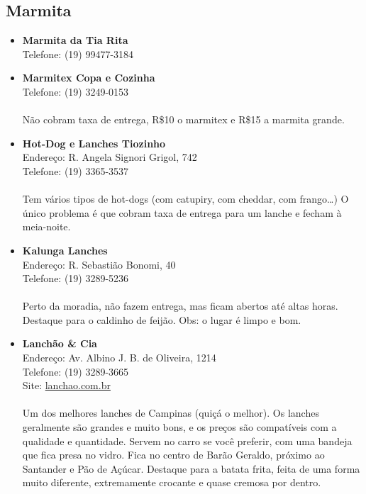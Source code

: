 \subsection{Marmita}

\begin{itemize}
\item \textbf{Marmita da Tia Rita}
  \\Telefone: (19) 99477-3184

\item \textbf{Marmitex Copa e Cozinha}
  \\Telefone: (19) 3249-0153
  \\
  \\Não cobram taxa de entrega, R\$10 o marmitex e R\$15 a marmita grande.

\item \textbf{Hot-Dog e Lanches Tiozinho}
  \\Endereço: R. Angela Signori Grigol, 742
  \\Telefone: (19) 3365-3537
  \\
  \\Tem vários tipos de hot-dogs (com catupiry, com cheddar, com frango{\dots})
  O único problema é que cobram taxa de entrega para um lanche e fecham à
  meia-noite.

\item \textbf{Kalunga Lanches}
  \\Endereço: R. Sebastião Bonomi, 40
  \\Telefone: (19) 3289-5236
  \\
  \\Perto da moradia, não fazem entrega, mas ficam abertos até altas horas.
  Destaque para o caldinho de feijão. Obs: o lugar é limpo e bom.

\item \textbf{Lanchão \& Cia}
  \\Endereço: Av. Albino J. B. de Oliveira, 1214
  \\Telefone: (19) 3289-3665
  \\Site: \url{lanchao.com.br}
  \\
  \\Um dos melhores lanches de Campinas (quiçá o melhor). Os lanches geralmente
  são grandes e muito bons, e os preços são compatíveis com a qualidade e
  quantidade. Servem no carro se você preferir, com uma bandeja que fica presa
  no vidro. Fica no centro de Barão Geraldo, próximo ao Santander e Pão de
  Açúcar. Destaque para a batata frita, feita de uma forma muito diferente,
  extremamente crocante e quase cremosa por dentro.


\end{itemize}
